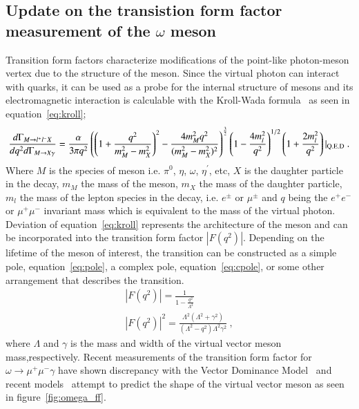 \documentclass{aip-cp}
\begin{document}
\subsection{Update on the transistion form factor measurement  of the $\omega$ meson}
Transition form factors characterize modifications of the point-like photon-meson vertex due to the structure of the meson. Since the virtual photon can interact with quarks, it can be used as a probe for the internal structure of mesons and its electromagnetic interaction is calculable with the Kroll-Wada formula~\cite{bib4} as seen in equation~\ref{eq:kroll};
\begin{equation}
\frac{d\Gamma_{M{\rightarrow l^{+}l^{-}X}}}{dq^{2} d\Gamma_{M{\rightarrow X\gamma}}} = \frac{\alpha}{3\pi q^{2}}\left(\left(1+\frac{q^{2}}{m^{2}_{M}-m^{2}_{X}}\right)^2 - \frac{4m^{2}_{M}q^2}{(m^{2}_{M}-m^{2}_{X})^2}\right)^\frac{3}{2}\left(1-\frac{4m_{l}^{2}}{q^{2}}\right)^{1/2}\left(1+\frac{2m_{l}^{2}}{q^{2}}\right) \vert_{\mathrm{Q.E.D}}  \label{eq:kroll} \ . \\
\end{equation}
 Where $M$ is the species of meson i.e. $\pi^0$, $\eta$, $\omega$, $\eta^{\prime}$, etc, $X$ is the daughter particle in the decay, $m_M$ the mass of the meson, $m_X$ the mass of the daughter particle, $m_l$ the mass of the lepton species in the decay, i.e. $e^{\pm}$ or $\mu^{\pm}$ and $q$ being the $e^{+}e^{-}$ or $\mu^{+}\mu^{-}$ invariant mass which is equivalent to the mass of the virtual photon. Deviation of equation~\ref{eq:kroll} represents the  architecture of the meson and can be incorporated into the transition form factor $\left| F(q^2)\right|$. Depending on the lifetime of the meson of interest, the transition can be constructed as a simple pole, equation~\ref{eq:pole}, a complex pole, equation~\ref{eq:cpole}, or some other arrangement that describes the transition.
 \begin{eqnarray}
\left| F(q^2)\right| = \frac{1}{1-\frac{q^2}{\Lambda^2}} \label{eq:pole} \\
\left| F(q^2)\right|^2 = \frac{\Lambda^2(\Lambda^2 + \gamma^2)}{(\Lambda^2 - q^2)\Lambda^2 \gamma^2} \label{eq:cpole} \ ,
 \end{eqnarray} 
 where $\Lambda$ and $\gamma$ is the mass and width of the virtual vector meson mass,respectively.
 Recent measurements of the transition form factor for $\omega \to \mu^+\mu^- \gamma$ have shown discrepancy with the Vector Dominance Model~\cite{bib5} and recent models~\cite{bib6} attempt to predict the shape of the virtual vector meson as seen in figure~\ref{fig:omega_ff}.
\end{document}
